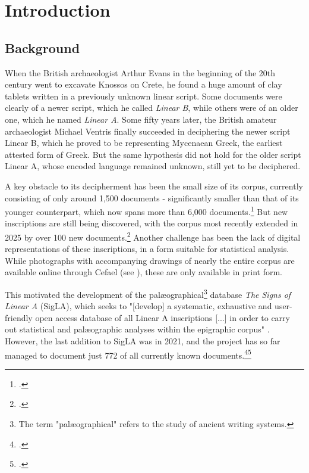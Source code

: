 \chapter{Introduction}

\section{Background}

When the British archaeologist Arthur Evans in the beginning of the 20th century went to excavate Knossos on Crete, he found a huge amount of clay tablets written in a previously unknown linear script.
Some documents were clearly of a newer script, which he called \textit{Linear B}, while others were of an older one, which he named \textit{Linear A}.
Some fifty years later, the British amateur archaeologist Michael Ventris finally succeeded in deciphering the newer script Linear B, which he proved to be representing Mycenaean Greek, the earliest attested form of Greek.
But the same hypothesis did not hold for the older script Linear A, whose encoded language remained unknown, still yet to be deciphered.

A key obstacle to its decipherment has been the small size of its corpus, currently consisting of only around 1,500 documents - significantly smaller than that of its younger counterpart, which now spans more than 6,000 documents.\footcite{SteeleAegeanWriting2023} 
But new inscriptions are still being discovered, with the corpus most recently extended in 2025 by over 100 new documents.\footcite{CNRLinearACorpus2025}
Another challenge has been the lack of digital representations of these inscriptions, in a form suitable for statistical analysis.
While photographs with accompanying drawings of nearly the entire corpus are available online through \acf{Cefael} (see \textcite{EtudesCretoises21}), these are only available in print form.

This motivated the development of the palæographical\footnote{The term "palæographical" refers to the study of ancient writing systems.} database \textit{The Signs of Linear A} (SigLA), which seeks to "[develop] a systematic, exhaustive and user-friendly open access database of all Linear A inscriptions [...] in order to carry out statistical and palæographic analyses within the epigraphic corpus" \parencite{SalgarellaCastellanSigLA2020}.
However, the last addition to SigLA was in 2021, and the project has so far managed to document just 772 of all currently known documents.\footcite{SigLAAboutPage}\footcite{SigLASearchDocuments}

